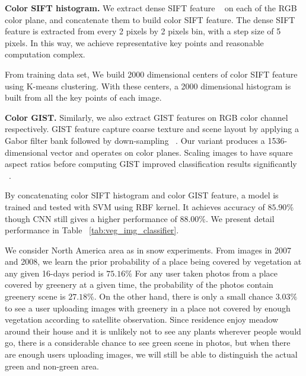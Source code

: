 \textbf{Color SIFT histogram.}
We extract dense SIFT feature ~\cite{lowe1999object} on each of the RGB color plane, and concatenate them to 
build color SIFT feature. The dense SIFT feature is extracted from every 2 pixels by 2 pixels bin, 
with a step size of 5 pixels. In this way, we achieve representative key points and reasonable 
computation complex. 

From training data set, We build 2000 dimensional centers of color SIFT feature 
using K-means clustering. With these centers, a 2000 dimensional histogram is built 
from all the key points of each image.

\textbf{Color GIST.} Similarly, we also extract GIST features on RGB color channel respectively.
GIST feature capture coarse texture
and scene layout by applying a Gabor filter bank followed by
down-sampling ~\cite{oliva2001modeling}. Our variant produces a
1536-dimensional vector and operates on color planes. Scaling
images to have square aspect ratios before computing GIST improved
classification results significantly ~\cite{douze2009evaluation}.

By concatenating color SIFT histogram and color GIST feature, 
a model is trained and tested with SVM using RBF kernel. It achieves accuracy of $85.90\%$ 
though CNN still gives a higher performance of $88.00\%$. We present detail performance in Table 
~\ref{tab:veg_img_classifier}.



We consider North America area as in snow experiments. From images in 2007 and 2008, 
we learn the prior probability of a place being covered by vegetation at any given 16-days period is $75.16\%$
For any user taken photos from a place covered by greenery at a given time, the probability of the photos contain greenery scene is $27.18\%$.
 On the other hand, there is only a small chance $3.03\%$
 to see a user uploading images with greenery in a place 
not covered by enough vegetation according to satellite observation. Since residence enjoy meadow around their house and it is unlikely not 
to see any plants wherever people would go, there is a considerable chance to see green scene in photos, but when there are enough users 
uploading images, we will still be able to distinguish the actual green and non-green area.

